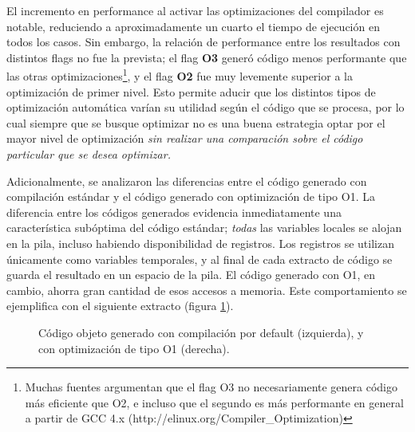 El incremento en performance al activar las optimizaciones del compilador es notable, reduciendo a aproximadamente un cuarto el tiempo de ejecución en todos los casos. Sin embargo, la relación de performance entre los resultados con distintos flags no fue la prevista; el flag \textbf{O3} generó código menos performante que las otras optimizaciones\footnote{Muchas fuentes argumentan que el flag O3 no necesariamente genera código más eficiente que O2, e incluso que el segundo es más performante en general a partir de GCC 4.x (http://elinux.org/Compiler\_Optimization)}, y el flag \textbf{O2} fue muy levemente superior a la optimización de primer nivel. Esto permite aducir que los distintos tipos de optimización automática varían su utilidad según el código que se procesa, por lo cual siempre que se busque optimizar no es una buena estrategia optar por el mayor nivel de optimización \emph{sin realizar una comparación sobre el código particular que se desea optimizar.}


Adicionalmente, se analizaron las diferencias entre el código generado con compilación estándar y el código generado con optimización de tipo O1. La diferencia entre los códigos generados evidencia inmediatamente una característica subóptima del código estándar; \emph{todas} las variables locales se alojan en la pila, incluso habiendo disponibilidad de registros. Los registros se utilizan únicamente como variables temporales, y al final de cada extracto de código se guarda el resultado en un espacio de la pila. El código generado con O1, en cambio, ahorra gran cantidad de esos accesos a memoria. Este comportamiento se ejemplifica con el siguiente extracto (figura \ref{fig:codigo-objeto-filtro-color}).

\begin{figure}[h]
	\begin{mdframed}
			\colplacechunks
	\end{mdframed}
	\caption{Código objeto generado con compilación por default (izquierda), y con optimización de tipo O1 (derecha).}
	\label{fig:codigo-objeto-filtro-color}
\end{figure}

